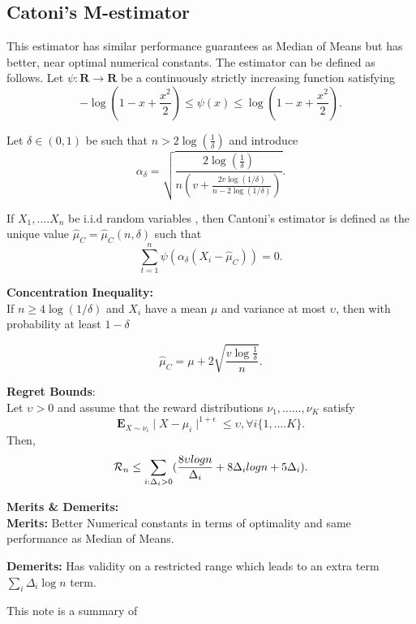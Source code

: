 \documentclass[11pt]{article}
\begin{document}
\subsection{Catoni's M-estimator}

This estimator has similar performance guarantees as Median of Means but has better, near optimal numerical constants.
The estimator can be defined as follows.
Let $\psi : \mathbf{R} \rightarrow  \mathbf{R} $ be a continuously strictly increasing function satisfying
$$-\log(1-x + \frac{x^{2}}{2}) \leq \psi(x) \leq \log(1-x + \frac{x^{2}}{2}) .$$

Let $\delta \in (0,1)$ be such that $n > 2\log(\frac{1}{\delta})$ and introduce 
$$\alpha_{\delta} = \sqrt{\frac{2\log(\frac{1}{\delta})}{n(v+ \frac{2v\log(1/\delta)}{n-2\log(1/\delta)})}}.$$

If $X_{1},....X_{n}$ be i.i.d random variables , then Cantoni's estimator is defined as the unique value $\hat\mu_{C} = \hat\mu_{C}(n,\delta)$ such that
$$\sum\limits^{n}_{t =1}\psi(\alpha_{\delta}(X_{i} - \hat\mu_{C})) = 0.$$

\noindent
\textbf{Concentration Inequality:}\\

If $n \geq 4\log(1/\delta)$ and $X_{i}$ have a mean $\mu$ and variance at most $\upsilon$, then with probability at least $1-\delta$

$$\hat\mu_{C} = \mu + 2\sqrt{\frac{v\log\frac{1}{\delta}}{n}} .$$

\noindent
\textbf{Regret Bounds}:\\
Let $\upsilon >0$ and assume that the reward distributions $\nu_{1} ,......,\nu_{K}$ satisfy
$$\mathbf{E}_{X\sim\nu_{i}}\mid X-\mu_{i} \mid^{1+\epsilon} \leq \upsilon ,\forall i  \{1,....K\}.$$
Then,
$$\mathcal{R}_{n} \leq \sum\limits_{i: \Delta_{i} >0} (\frac{8\upsilon logn}{\Delta_{i}} + 8\Delta_{i}logn + 5\Delta_{i}).$$

\noindent
\textbf{Merits \& Demerits:}\\

\textbf{Merits:} Better Numerical constants in terms of optimality and same performance as Median of Means.

\textbf{Demerits:} Has validity on a restricted range which leads to an extra term $\sum\limits_{i} \Delta_{i} \log n$ term.\\

\begin{flushleft}
This note is a summary of  \cite{bubeck2013bandits}
\end{flushleft}


\end{document}
